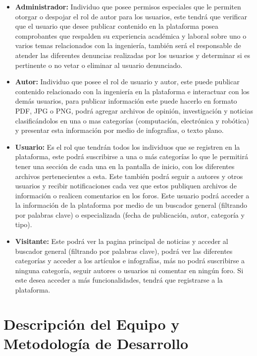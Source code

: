 \documentclass[a4paper,12 pt]{article}
\begin{document}
\begin{itemize}
    \item \textbf{Administrador:} Individuo que posee permisos especiales que le 
    permiten otorgar o despojar el rol de autor para los usuarios, este tendrá que
    verificar que el usuario que desee publicar contenido en la plataforma posea
    comprobantes que respalden su experiencia académica y laboral sobre uno o varios
    temas relacionados con la ingeniería, también será el responsable de atender las
    diferentes denuncias realizadas por los usuarios y determinar si es pertinente o 
    no vetar o eliminar al usuario denunciado.
    
    \item \textbf{Autor:} Individuo que posee el rol de usuario y autor, este puede 
    publicar contenido relacionado con la ingeniería en la plataforma e interactuar
    con los demás usuarios, para publicar información este puede hacerlo en formato
    PDF, JPG o PNG, podrá agregar archivos de opinión, investigación y noticias
    clasificándolos en una o mas categorías (computación, electrónica y robótica)
    y presentar esta información por medio de infografías, o texto plano.
    
    \item \textbf{Usuario:} Es el rol que tendrán todos los individuos que se
    registren en la plataforma, este podrá suscribirse a una o más categorías lo que
    le permitirá tener una sección de cada una en la pantalla de inicio, con los
    diferentes archivos pertenecientes a esta. Este también podrá seguir a autores y
    otros usuarios y recibir notificaciones cada vez que estos publiquen archivos de
    información o realicen comentarios en los foros. Este usuario podrá acceder a la
    información de la plataforma por medio de un buscador general (filtrando por
    palabras clave) o especializada (fecha de publicación, autor, categoría y tipo).
    
    \item \textbf{Visitante:} Este podrá ver la pagina principal de noticias y
    acceder al buscador general (filtrando por palabras clave), podrá ver las
    diferentes categorías y acceder a los artículos e infografías, más no podrá
    suscribirse a ninguna categoría, seguir autores o usuarios ni comentar en ningún
    foro. Si este desea acceder a más funcionalidades, tendrá que registrarse a la
    plataforma.
\end{itemize}{}

\section{Descripción del Equipo y Metodología de Desarrollo}
\end{document}
